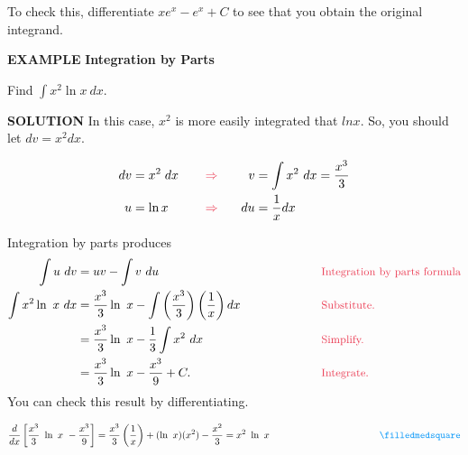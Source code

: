 \documentclass[12pt]{article}
\begin{document}
\bigskip

\noindent To check this, differentiate $xe^x - e^x + C$ to see that you obtain the original integrand.

\pagebreak

\sffamily
\noindent \color{myblue} \large \textbf{EXAMPLE} \color{black} \normalsize \textbf{Integration by Parts}
\rmfamily

\bigskip

\noindent Find $\displaystyle \int x^2 \ln x \ dx$.

\bigskip

\sffamily
\noindent \color{myblue} \textbf{SOLUTION} \color{black} \rmfamily \hspace{.3cm} In this case, $x^2$ is more easily integrated that $ln x$. So, you should let $dv = x^2 dx$.

\begin{alignat*}{3}
dv &= x^2 \hspace{.1cm}dx \hspace{.3cm}&&\color{mypink}\Rightarrow\color{black}& v &= \int x^2 \ dx = \frac{x^3}{3}\\
u &= \ln x &&\color{mypink}\Rightarrow\color{black} & \hspace{.3cm}du &= \frac{1}{x} dx
\end{alignat*}

\noindent Integration by parts produces
\begin{alignat*}{2}
\int u \ dv &= uv - \int v \ du \ \hspace{2cm} &&\text{\color{mypink}\small Integration by parts formula}\\
 \int x^2 \ln \ x \ dx &= \frac{x^3}{3} \ln \ x - \int \left(\frac{x^3}{3}\right) \left(\frac{1}{x}\right) dx \hspace{2cm} &&\text{\color{mypink}\small Substitute.}\\
 &= \frac{x^3}{3} \ln \ x - \frac{1}{3} \int x^2 \ dx &&\text{\color{mypink}\small Simplify.}\\
 &= \frac{x^3}{3} \ln \ x - \frac{x^3}{9} + C. &&\text{\color{mypink}\small Integrate.}
\end{alignat*}
You can check this result by differentiating.

$$ \frac{d}{dx} \left[\frac{x^3}{3} \ \ln \ x \ - \frac{x^3}{9} \right] = \frac{x^3}{3} \left(\frac{1}{x} \right) + (\ln \ x)(x^2) - \frac{x^2}{3} = x^2 \ \ln \ x  \hspace{4cm} \color{myblue} \filledmedsquare$$

\vspace{1cm}
\end{document}
